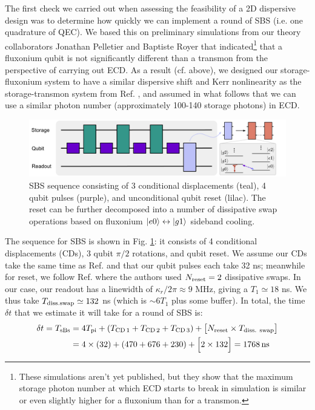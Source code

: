 The first check we carried out when assessing the feasibility of a 2D dispersive design was to determine how quickly we can implement a round of SBS (i.e. one quadrature of QEC). We based this on preliminary simulations from our theory collaborators Jonathan Pelletier and Baptiste Royer that indicated\footnote{These simulations aren't yet published, but they show that the maximum storage photon number at which ECD starts to break in simulation is similar or even slightly higher for a fluxonium than for a transmon.} that a fluxonium qubit is not significantly different than a transmon from the perspective of carrying out ECD. As a result (cf. above), we designed our storage-fluxonium system to have a similar dispersive shift and Kerr nonlinearity as the storage-transmon system from Ref. \cite{sivak2023gkp-expt}, and assumed in what follows that we can use a similar photon number (approximately 100-140 storage photons) in ECD. 
\begin{figure}[h]
    \centering
 \includegraphics[width=\linewidth]{Figures/5/SBS_Sideband_Reset.pdf}
    \caption{SBS sequence consisting of 3 conditional displacements (teal), 4 qubit pulses (purple),  and unconditional qubit reset (lilac). The reset can be further decomposed into a number of dissipative swap operations based on fluxonium $\lvert e0\rangle\leftrightarrow\lvert g1\rangle$ sideband cooling.}
    \label{fig:5_SBS_Sideband_Reset}
\end{figure}

\noindent The sequence for SBS is shown in Fig. \ref{fig:5_SBS_Sideband_Reset}: it consists of 4 conditional displacements (CDs), 3 qubit $\pi/2$ rotations, and qubit reset. We assume our CDs take the same time as Ref. \cite{sivak2023gkp-expt} and that our qubit pulses each take 32 ns; meanwhile for reset, we follow Ref. \cite{nordquantique2023gkp-expt} where the authors used $N_{\rm reset} = 2$ dissipative swaps. In our case, our readout has a linewidth of $\kappa_r / 2\pi \approx 9$ MHz, giving a $T_1 \simeq 18$ ns. We thus take $T_{\rm diss. swap} \simeq 132$ ns (which is $\sim\!6T_1$ plus some buffer). In total, the time $\delta t$ that we estimate it will take for a round of SBS is:
\begin{align*}
\delta t = T_{\rm sBs}  &= 4T_{\rm pi} + (T_{\rm CD\,1} + T_{\rm CD\,2} + T_{\rm CD\,3}) + \big[N_{\text{reset}}\times T_{\text{diss. swap}}\big] \\ &= 4\times (32) + (470 + 676 + 230) + \Big[2 \times 132\Big] = 1768\, {\rm ns}
\end{align*}